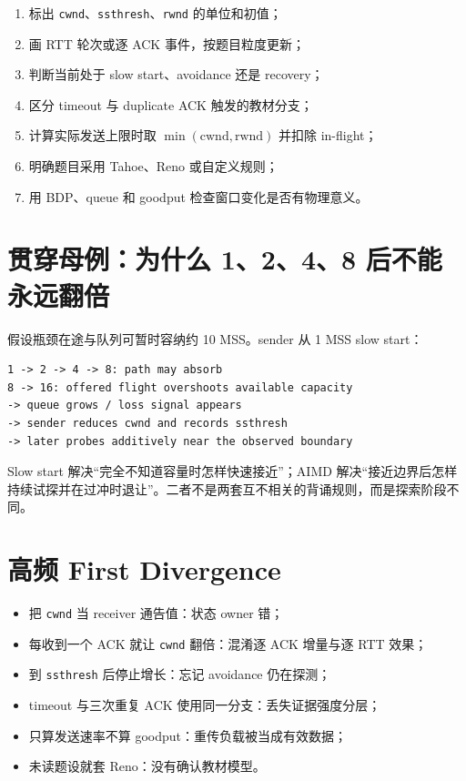 \documentclass[UTF8,fontset=none,11pt,a4paper]{ctexart}
\providecommand{\tightlist}{\setlength{\itemsep}{0pt}\setlength{\parskip}{0pt}}
\providecommand{\passthrough}[1]{#1}
\begin{document}
\begin{enumerate}
\def\labelenumi{\arabic{enumi}.}
\tightlist
\item
  标出
  \passthrough{\lstinline!cwnd!}、\passthrough{\lstinline!ssthresh!}、\passthrough{\lstinline!rwnd!}
  的单位和初值；
\item
  画 RTT 轮次或逐 ACK 事件，按题目粒度更新；
\item
  判断当前处于 slow start、avoidance 还是 recovery；
\item
  区分 timeout 与 duplicate ACK 触发的教材分支；
\item
  计算实际发送上限时取 \(\min(\text{cwnd}, \text{rwnd})\) 并扣除
  in-flight；
\item
  明确题目采用 Tahoe、Reno 或自定义规则；
\item
  用 BDP、queue 和 goodput 检查窗口变化是否有物理意义。
\end{enumerate}

\section{贯穿母例：为什么 1、2、4、8
后不能永远翻倍}\label{13-ux8d2fux7a7fux6bcdux4f8bux4e3aux4ec0ux4e48-1248-ux540eux4e0dux80fdux6c38ux8fdcux7ffbux500d}

假设瓶颈在途与队列可暂时容纳约 10 MSS。sender 从 1 MSS slow start：

\begin{lstlisting}
1 -> 2 -> 4 -> 8: path may absorb
8 -> 16: offered flight overshoots available capacity
-> queue grows / loss signal appears
-> sender reduces cwnd and records ssthresh
-> later probes additively near the observed boundary
\end{lstlisting}

Slow start 解决``完全不知道容量时怎样快速接近''；AIMD
解决``接近边界后怎样持续试探并在过冲时退让''。二者不是两套互不相关的背诵规则，而是探索阶段不同。

\section{高频 First
Divergence}\label{14-ux9ad8ux9891-first-divergence}

\begin{itemize}
\tightlist
\item
  把 \passthrough{\lstinline!cwnd!} 当 receiver 通告值：状态 owner 错；
\item
  每收到一个 ACK 就让 \passthrough{\lstinline!cwnd!} 翻倍：混淆逐 ACK
  增量与逐 RTT 效果；
\item
  到 \passthrough{\lstinline!ssthresh!} 后停止增长：忘记 avoidance
  仍在探测；
\item
  timeout 与三次重复 ACK 使用同一分支：丢失证据强度分层；
\item
  只算发送速率不算 goodput：重传负载被当成有效数据；
\item
  未读题设就套 Reno：没有确认教材模型。
\end{itemize}
\end{document}
